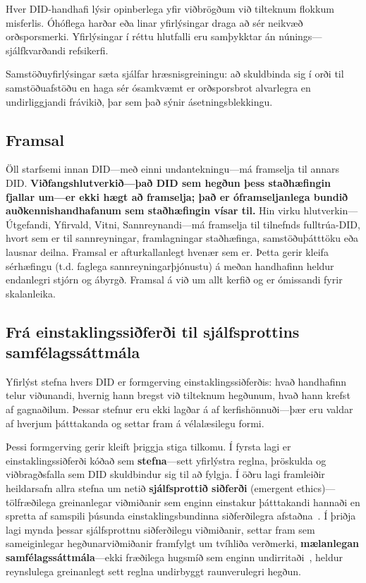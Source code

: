 \documentclass[11pt,a4paper,twocolumn]{article}
\begin{document}
Hver DID-handhafi lýsir opinberlega yfir viðbrögðum við tilteknum flokkum misferlis. Óhóflega harðar eða linar yfirlýsingar draga að sér neikvæð orðsporsmerki. Yfirlýsingar í réttu hlutfalli eru samþykktar án núnings---sjálfkvarðandi refsikerfi.

Samstöðuyfirlýsingar sæta sjálfar hræsnisgreiningu: að skuldbinda sig í orði til samstöðuafstöðu en haga sér ósamkvæmt er orðsporsbrot alvarlegra en undirliggjandi frávikið, þar sem það sýnir ásetningsblekkingu.

\subsection{Framsal}

Öll starfsemi innan DID---með einni undantekningu---má framselja til annars DID. \textbf{Viðfangshlutverkið---það DID sem hegðun þess staðhæfingin fjallar um---er ekki hægt að framselja; það er óframseljanlega bundið auðkennishandhafanum sem staðhæfingin vísar til.} Hin virku hlutverkin---Útgefandi, Yfirvald, Vitni, Sannreynandi---má framselja til tilnefnds fulltrúa-DID, hvort sem er til sannreyningar, framlagningar staðhæfinga, samstöðuþátttöku eða lausnar deilna. Framsal er afturkallanlegt hvenær sem er. Þetta gerir kleifa sérhæfingu (t.d. faglega sannreyningarþjónustu) á meðan handhafinn heldur endanlegri stjórn og ábyrgð. Framsal á við um allt kerfið og er ómissandi fyrir skalanleika.

\subsection{Frá einstaklingssiðferði til sjálfsprottins samfélagssáttmála}

Yfirlýst stefna hvers DID er formgerving einstaklingssiðferðis: hvað handhafinn telur viðunandi, hvernig hann bregst við tilteknum hegðunum, hvað hann krefst af gagnaðilum. Þessar stefnur eru ekki lagðar á af kerfishönnuði---þær eru valdar af hverjum þátttakanda og settar fram á vélalæsilegu formi.

Þessi formgerving gerir kleift þriggja stiga tilkomu. Í fyrsta lagi er einstaklingssiðferði kóðað sem \textbf{stefna}---sett yfirlýstra reglna, þröskulda og viðbragðsfalla sem DID skuldbindur sig til að fylgja. Í öðru lagi framleiðir heildarsafn allra stefna um netið \textbf{sjálfsprottið siðferði} (emergent ethics)---tölfræðilega greinanlegar viðmiðanir sem enginn einstakur þátttakandi hannaði en spretta af samspili þúsunda einstaklingsbundinna siðferðilegra afstaðna~\cite{durkheim1893}. Í þriðja lagi mynda þessar sjálfsprottnu siðferðilegu viðmiðanir, settar fram sem sameiginlegar hegðunarviðmiðanir framfylgt um tvíhliða verðmerki, \textbf{mælanlegan samfélagssáttmála}---ekki fræðilega hugsmíð sem enginn undirritaði~\cite{rawls1971}, heldur reynslulega greinanlegt sett reglna undirbyggt raunverulegri hegðun.
\end{document}
